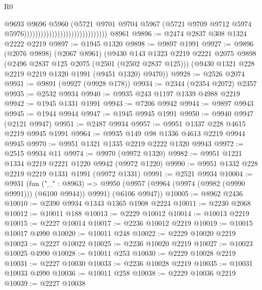 \begin{lexlean}{R0}
\begin{coremodule}
                                                            @9693
                                                            @9696
                                                            @5960
                                                            (@5721
                                                              @9701
                                                              @9704
                                                              @5967
                                                              (@5721
                                                                @9709
                                                                @9712
                                                                @5974
                                                                @5976))))))))))))))))))))))))))))))
    @8961
@9896 := @2474 @2837 @308 @1324 @2222 @2219
@9897 := @1945 @1320
@9898 := @9897 @1991
@9927 := @9896
    (@2076 @9898)
    (@2067 @8961)
    (@9430
      @143
      @1323
      @2219
      @2221
      @2075
      @9898
      (@2496 @2837 @125 @2075 (@2501 (@2502 @2837 @125)))
      (@9430 @1321 @228 @2219 @2219 @1320 @1991 (@9451 @1320) @9470))
@9928 := @2526 @2074
@9931 := @9891 (@9927 (@9928 @178))
@9934 := @2344 (@2354 @2072) @2357
@9935 := @2532 @9934
@9940 := @9935 @243 @1197 @1339 @4988 @2219
@9942 := @1945 @1331 @1991
@9943 := @7206 @9942
@9944 := @9897 @9943
@9945 := @1944 @9944
@9947 := @1945 @9945 @1991
@9950 := @9940 @9947 (@2121 @9947)
@9951 := @2487 @9934
@9957 := @9951 @1337 @228 @4615 @2219 @9945 @1991
@9964 := @9935 @149 @98 @1336 @4613 @2219 @9944 @9945
@9970 := @9951 @1321 @1335 @2219 @2222 @1320 @9943
@9972 := @2515 @9934 @11
@9974 := @9970 (@9972 @1320)
@9982 := @9951 @1221 @1334 @2219 @2221 @1220 @9942 (@9972 @1220)
@9990 := @9951 @1332 @228 @2219 @2219 @1331 @1991 (@9972 @1331)
@9991 := @2521 @9934
@10004 := @9931
    (fun ("_" : @8963) =>
    @9950 (@9957 (@9964 (@9974 (@9982 (@9990 @9991))) (@6100 @9944)) @9991) (@6106 @9947))
@10005 := @8962 @2436
@10010 := @2390 @9934 @1343 @1365 @1908 @2224
@10011 := @2230 @2068
@10012 := @10011 @188
@10013 := @2229 @10012
@10014 := @10013 @2219
@10015 := @2227 @10014
@10017 := @2236 @10012 @2219
@10019 := @10015 @10017 @4990
@10020 := @10011 @248
@10022 := @2229 @10020 @2219
@10023 := @2227 @10022
@10025 := @2236 @10020 @2219
@10027 := @10023 @10025 @4990
@10028 := @10011 @253
@10030 := @2229 @10028 @2219
@10031 := @2227 @10030
@10033 := @2236 @10028 @2219
@10035 := @10031 @10033 @4990
@10036 := @10011 @258
@10038 := @2229 @10036 @2219
@10039 := @2227 @10038

\end{coremodule}
\end{lexlean}
